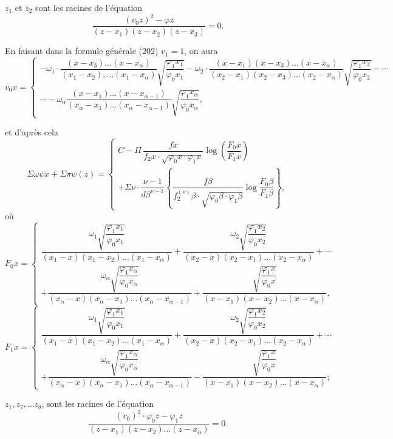 \documentclass{article}
\begin{document}
$z_1$ et $z_2$ sont les racines de l'équation
\[ \frac{(v_0 z)^{2}-\varphi z}{(z-x_1)(z-x_2)(z-x_3)} = 0. \]

En faisant dans la formule générale (202) $v_1 = 1$, on aura
\[ v_0 x = \begin{cases}
-\omega_1 \cdot \dfrac{(x-x_3)\ldots(x-x_\alpha)}{(x_1-x_2),\ldots(x_1-x_\alpha)}\sqrt{\dfrac{\varphi_1 x_1}{\varphi_0 x_1}} - \omega_2 \cdot \dfrac{(x-x_1)(x-x_3)\ldots(x-x_\alpha)}{(x_2-x_1)(x_2-x_3)\ldots(x_2-x_\alpha)}\sqrt{\dfrac{\varphi_1 x_2}{\varphi_0 x_2}} - \cdots \\
\cdots - \omega_\alpha \dfrac{(x-x_1)\ldots(x-x_{\alpha-1})}{(x_\alpha-x_1)\ldots(x_\alpha-x_{\alpha-1})}\sqrt{\dfrac{\varphi_1 x_\alpha}{\varphi_0 x_\alpha}},
\end{cases} \]

et d'après cela
\[ \Sigma\omega\psi x + \Sigma\pi\psi(z) = \begin{cases}
C - \Pi\,\dfrac{f x}{f_2 x \cdot \sqrt{\varphi_0 x \cdot \varphi_1 x}}\log\left(\dfrac{F_0 x}{F_1 x}\right) \\
+ \Sigma\nu \cdot \dfrac{\nu-1}{d\beta^{\nu-1}} \left\{ \dfrac{f\beta}{f_2^{(\nu)}\beta \cdot \sqrt{\varphi_0\beta \cdot \varphi_1\beta}}\log\dfrac{F_0\beta}{F_1\beta} \right\},
\end{cases} \]
où
\[ F_0 x = \begin{cases}
\dfrac{\omega_1\sqrt{\dfrac{\varphi_1 x_1}{\varphi_0 x_1}}}{(x_1-x)(x_1-x_2)\ldots(x_1-x_\alpha)} + \dfrac{\omega_2\sqrt{\dfrac{\varphi_1 x_2}{\varphi_0 x_2}}}{(x_2-x)(x_2-x_1)\ldots(x_2-x_\alpha)} + \cdots \\
+ \dfrac{\omega_\alpha\sqrt{\dfrac{\varphi_1 x_\alpha}{\varphi_0 x_\alpha}}}{(x_\alpha-x)(x_\alpha-x_1)\ldots(x_\alpha-x_{\alpha-1})} + \dfrac{\sqrt{\dfrac{\varphi_1 x}{\varphi_0 x}}}{(x-x_1)(x-x_2)\ldots(x-x_\alpha)},
\end{cases} \]
\[ F_1 x = \begin{cases}
\dfrac{\omega_1\sqrt{\dfrac{\varphi_1 x_1}{\varphi_0 x_1}}}{(x_1-x)(x_1-x_2)\ldots(x_1-x_\alpha)} + \dfrac{\omega_2\sqrt{\dfrac{\varphi_1 x_2}{\varphi_0 x_2}}}{(x_2-x)(x_2-x_1)\ldots(x_2-x_\alpha)} + \cdots \\
+ \dfrac{\omega_\alpha\sqrt{\dfrac{\varphi_1 x_\alpha}{\varphi_0 x_\alpha}}}{(x_\alpha-x)(x_\alpha-x_1)\ldots(x_\alpha-x_{\alpha-1})} - \dfrac{\sqrt{\dfrac{\varphi_1 x}{\varphi_0 x}}}{(x-x_1)(x-x_2)\ldots(x-x_\alpha)};
\end{cases} \]

$z_1, z_2, \ldots z_\theta$, sont les racines de l'équation
\[ \frac{(v_0)^{2} \cdot \varphi_0 z-\varphi_1 z}{(z-x_1)(z-x_2)\ldots(z-x_\alpha)} = 0. \]
\end{document}
